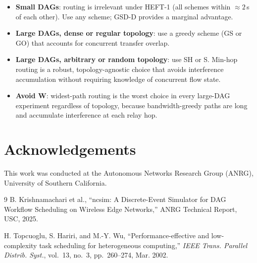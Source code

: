 \documentclass[11pt]{article}
\begin{document}
\begin{itemize}
  \item \textbf{Small DAGs}: routing is irrelevant under HEFT-1 (all schemes
        within $\approx 2$\,s of each other).  Use any scheme; GSD-D provides
        a marginal advantage.
  \item \textbf{Large DAGs, dense or regular topology}: use a greedy scheme
        (GS or GO) that accounts for concurrent transfer overlap.
  \item \textbf{Large DAGs, arbitrary or random topology}: use SH or S.
        Min-hop routing is a robust, topology-agnostic choice that avoids
        interference accumulation without requiring knowledge of concurrent
        flow state.
  \item \textbf{Avoid W}: widest-path routing is the worst choice in every
        large-DAG experiment regardless of topology, because bandwidth-greedy
        paths are long and accumulate interference at each relay hop.
\end{itemize}

\section*{Acknowledgements}
This work was conducted at the Autonomous Networks Research Group (ANRG),
University of Southern California.

\begin{thebibliography}{9}
  B. Krishnamachari et al., ``ncsim: A Discrete-Event Simulator for DAG Workflow
  Scheduling on Wireless Edge Networks,'' ANRG Technical Report, USC, 2025.

  H. Topcuoglu, S. Hariri, and M.-Y. Wu, ``Performance-effective and low-complexity
  task scheduling for heterogeneous computing,''
  \textit{IEEE Trans. Parallel Distrib. Syst.}, vol.~13, no.~3, pp.~260--274,
  Mar. 2002.
\end{thebibliography}
\end{document}
